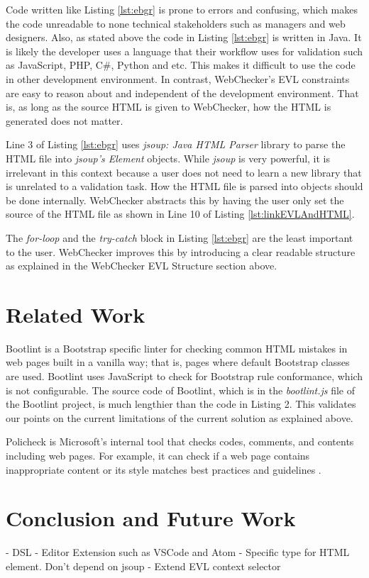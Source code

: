 \documentclass[conference]{IEEETran}
\begin{document}
Code written like Listing \ref{lst:ebgr} is prone to errors and confusing, which makes the code unreadable to none technical stakeholders such as managers and web designers. Also, as stated above the code in Listing  \ref{lst:ebgr}  is written in Java. It is likely the developer uses a language that their workflow uses for validation such as JavaScript, PHP, C\#, Python and etc. This makes it difficult to use the code in other development environment. In contrast, WebChecker's EVL constraints are easy to reason about and independent of the development environment. That is, as long as the source HTML is given to WebChecker, how the HTML is generated does not matter. 

Line 3 of Listing \ref{lst:ebgr} uses \textit{jsoup: Java HTML Parser}\cite{jsoup} library to parse the HTML file into \textit{jsoup's Element} objects. While \textit{jsoup} is very powerful, it is irrelevant in this context because a user does not need to learn a new library that is unrelated to a validation task. How the HTML file is parsed into objects should be done internally. WebChecker abstracts this by having the user only set the source of the HTML file as shown in Line 10 of Listing \ref{lst:linkEVLAndHTML}.           


The \textit{for-loop} and the \textit{try-catch} block in Listing \ref{lst:ebgr} are the least important to the user. WebChecker improves this by introducing a clear readable structure as explained in the WebChecker EVL Structure section above.  


\section{Related Work}
Bootlint \cite{bootlint} is a Bootstrap specific linter for checking common HTML mistakes in web pages built in a vanilla way; that is, pages where default Bootstrap classes are used. Bootlint uses JavaScript to check for Bootstrap rule conformance, which is not configurable. The source code of Bootlint, which is in the \textit{bootlint.js} file of the Bootlint project, is much lengthier than the code in Listing 2. This validates our points on the current limitations of the current solution as explained above. 

Policheck is Microsoft's internal tool that checks codes, comments, and contents including web pages. For example, it can check if a web page contains inappropriate content or its style matches best practices and guidelines \cite{christakis16}.



    

\section{Conclusion and Future Work}

- DSL
- Editor Extension such as VSCode and Atom
- Specific type for HTML element. Don't depend on jsoup
- Extend EVL context selector 

 

\end{document}
